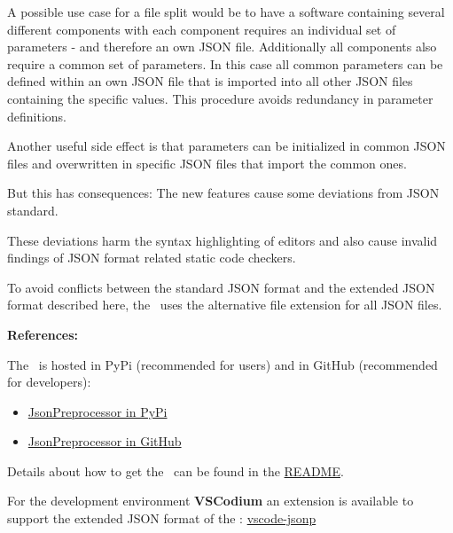 A possible use case for a file split would be to have a software containing several different components with each component requires an individual set of
parameters - and therefore an own JSON file. Additionally all components also require a common set of parameters. In this case all common parameters can be defined
within an own JSON file that is imported into all other JSON files containing the specific values. This procedure avoids redundancy in parameter definitions.

Another useful side effect is that parameters can be initialized in common JSON files and overwritten in specific JSON files that import the common ones.

But this has consequences: The new features cause some deviations from JSON standard. 

These deviations harm the syntax highlighting of editors and also cause invalid findings of JSON format related static code checkers.

To avoid conflicts between the standard JSON format and the extended JSON format described here, the \pkg\ uses the alternative file extension
 for all JSON files.

\newpage

\textbf{References:}

The \pkg\ is hosted in PyPi (recommended for users) and in GitHub (recommended for developers):

\begin{itemize}
   \item \href{https://pypi.org/project/JsonPreprocessor/}{JsonPreprocessor in PyPi}
   \item \href{https://github.com/test-fullautomation/python-jsonpreprocessor}{JsonPreprocessor in GitHub}
\end{itemize}

Details about how to get the \pkg\ can be found in the
\href{https://github.com/test-fullautomation/python-jsonpreprocessor/blob/develop/README.rst}{README}.

For the development environment \textbf{VSCodium} an extension is available to support the extended JSON format of the \pkg:
\href{https://github.com/test-fullautomation/vscode-jsonp}{vscode-jsonp}

